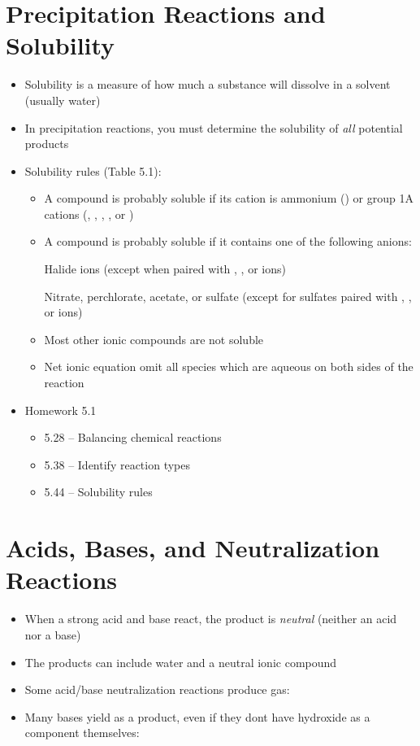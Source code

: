 \documentclass[12pt, openany, letterpaper]{memoir}
\begin{document}
\section{Precipitation Reactions and Solubility}
\begin{itemize}
	\item Solubility is a measure of how much a substance will dissolve in a solvent (usually water)
	\item In precipitation reactions, you must determine the solubility of \emph{all} potential products
	\item Solubility rules (Table 5.1):
	\begin{itemize}
		\item A compound is probably soluble if its cation is ammonium () or group 1A cations (, , , , or )
		\item A compound is probably soluble if it contains one of the following anions:
		
		Halide ions (except when paired with , , or  ions)
		
		Nitrate, perchlorate, acetate, or sulfate (except for sulfates paired with , , or  ions)
		\item Most other ionic compounds are not soluble
		\item Net ionic equation omit all species which are aqueous on both sides of the reaction
	\end{itemize}
	\item Homework 5.1
	\begin{itemize}
		\item 5.28 -- Balancing chemical reactions
		\item 5.38 -- Identify reaction types
		\item 5.44 -- Solubility rules
	\end{itemize}
\end{itemize}
\section{Acids, Bases, and Neutralization Reactions}
\begin{itemize}
	\item When a strong acid and base react, the product is \emph{neutral} (neither an acid nor a base)
	\item The products can include water and a neutral ionic compound
	\item Some acid/base neutralization reactions produce gas: 
	\item Many bases yield  as a product, even if they dont have hydroxide as a component themselves: 
\end{itemize}
\end{document}
